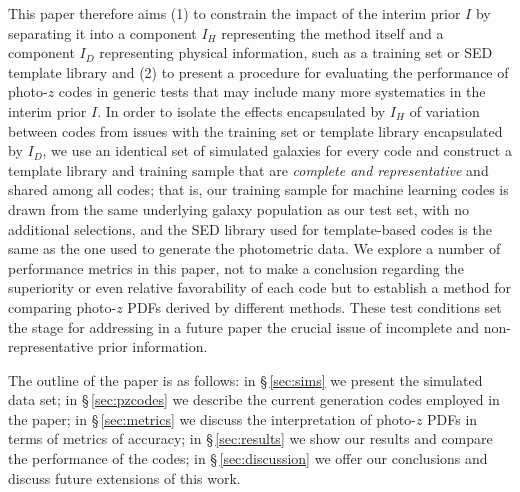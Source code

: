 This paper therefore aims (1) to constrain the impact of the interim prior $I$ by separating it into a component $I_{H}$ representing the method itself and a component $I_{D}$ representing physical information, such as a training set or SED template library and (2) to present a procedure for evaluating the performance of photo-$z$ codes in generic tests that may include many more systematics in the interim prior $I$.
In order to isolate the effects encapsulated by $I_{H}$ of variation between codes from issues with the training set or template library encapsulated by $I_{D}$, we use an identical set of simulated galaxies for every code and construct a template library and training sample that are {\it complete and representative} and shared among all codes; that is, our training sample for machine learning codes is drawn from the same underlying galaxy population as our test set, with no additional selections, and the SED library used for template-based codes is the same as the one used to generate the photometric data.
We explore a number of performance metrics in this paper, not to make a conclusion regarding the superiority or even relative favorability of each code but to establish a method for comparing photo-$z$ PDFs derived by different methods.
These test conditions set the stage for addressing in a future paper the crucial issue of incomplete and non-representative prior information.

The outline of the paper is as follows: in \S\,\ref{sec:sims} we present the simulated data set; in \S\,\ref{sec:pzcodes} we describe the current generation codes employed in the paper;  in \S\,\ref{sec:metrics} we discuss the interpretation of photo-$z$ PDFs in terms of metrics of accuracy; in \S\,\ref{sec:results} we show our results and compare the performance of the codes; in \S\,\ref{sec:discussion} we offer our conclusions and discuss future extensions of this work.
